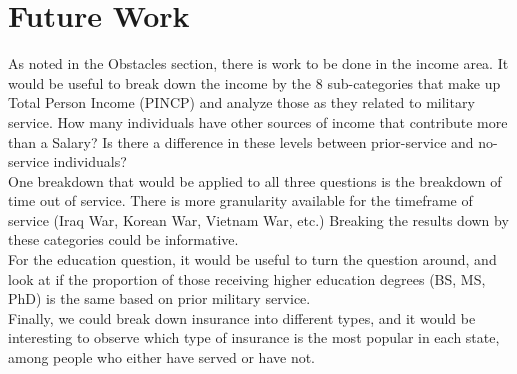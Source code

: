 \documentclass{article}
\begin{document}
\section{Future Work}
As noted in the Obstacles section, there is work to be done in the income area. It would be useful to break down the income by the 8 sub-categories that make up Total Person Income (PINCP) and analyze those as they related to military service. How many individuals have other sources of income that contribute more than a Salary? Is there a difference in these levels between prior-service and no-service individuals?\\

One breakdown that would be applied to all three questions is the breakdown of time out of service. There is more granularity available for the timeframe of service (Iraq War, Korean War, Vietnam War, etc.) Breaking the results down by these categories could be informative.\\ 

For the education question, it would be useful to turn the question around, and look at if the proportion of those receiving higher education degrees (BS, MS, PhD) is the same based on prior military service.\\

Finally, we could break down insurance into different types, and it would be interesting to observe which type of insurance is the most popular in each state, among people who either have served or have not.
\end{document}
